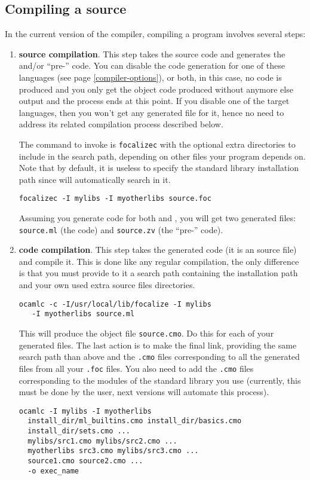 \subsection{Compiling a source}
In the current version of the {\focal} compiler, compiling a {\focal}
program involves several steps:
\begin{enumerate}
  \item {\bf {\focal} source compilation}. This step takes the {\focal}
    source code and generates the {\ocaml} and/or ``pre-''{\coq} code.
    You can disable the code generation for one of these languages
    (see page \ref{compiler-options}), or both, in this case, no code is
    produced and you only get the {\focal} object code produced without
    anymore else output and the process ends at this point. If you
    disable one of the target languages, then you won't get any
    generated file for it, hence no need to address its related
    compilation process described below.

  The command to invoke is {\tt focalizec} with the optional extra
  directories to include in the search path, depending on other
  {\focal} files your program depends on. Note that by default, it is
  useless to specify the standard library installation path since
  {\focal} will automatically search in it.
  \begin{center}
  {\tt focalizec -I mylibs -I myotherlibs source.foc}
  \end{center}
  Assuming you generate code for both {\ocaml} and {\coq}, you will get
  two generated files: {\tt source.ml} (the {\ocaml} code) and
  {\tt source.zv} (the ``pre-''{\coq} code).

  \item {\bf {\ocaml} code compilation}. This step takes the generated
    {\ocaml} code (it is an {\ocaml} source file) and compile it. This
    is done like any regular {\ocaml} compilation, the only difference
    is that you must provide to it a search path containing the
    {\focal} installation path and your own used extra {\focal} source
    files directories.
    \begin{verbatim}
ocamlc -c -I/usr/local/lib/focalize -I mylibs
   -I myotherlibs source.ml
    \end{verbatim}
    This will produce the {\ocaml} object file {\tt source.cmo}. Do
    this for each of your generated {\ocaml} files. The last action is
    to make the final link, providing the same search path than above
    and the {\tt .cmo} files corresponding to all the generated
    {\ocaml} files from all your {\focal} {\tt .foc} files. You also
    need to add the {\tt .cmo} files corresponding to the modules of
    the standard library you use (currently, this must be done by the
    user, next versions will automate this process).
    \begin{verbatim}
ocamlc -I mylibs -I myotherlibs
  install_dir/ml_builtins.cmo install_dir/basics.cmo
  install_dir/sets.cmo ...
  mylibs/src1.cmo mylibs/src2.cmo ...
  myotherlibs src3.cmo mylibs/src3.cmo ...
  source1.cmo source2.cmo ...
  -o exec_name
    \end{verbatim}


\end{enumerate}
